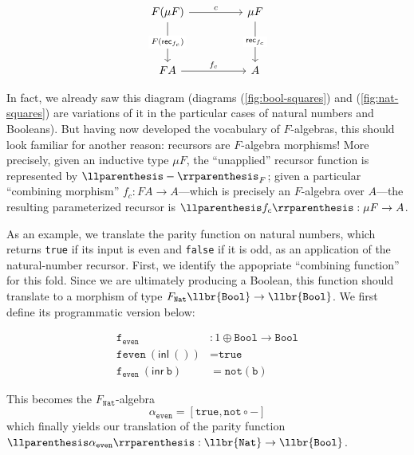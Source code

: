 \[\begin{tikzcd}
	{F(\mu F)} && {\mu F} \\
	\\
	{F A} && A
	\arrow["c", from=1-1, to=1-3]
	\arrow["{F (\mathsf{rec}_{f_c})}"{description}, from=1-1, to=3-1]
	\arrow["{\mathsf{rec}_{f_c}}"{description}, from=1-3, to=3-3]
	\arrow["{f_c}", from=3-1, to=3-3]
\end{tikzcd}\]

In fact, we already saw this diagram (diagrams (\ref{fig:bool-squares}) and (\ref{fig:nat-squares})
are variations of it in the particular cases of natural numbers and Booleans). But having now
developed the vocabulary of $F$-algebras, this should look familiar for another reason: recursors
are $F$-algebra morphisms! More precisely, given an inductive type $\mu F$, the ``unapplied''
recursor function is represented by $\llpr{-}_F$; given a particular ``combining morphism'' $f_c : F
A \to A$---which is precisely an $F$-algebra over $A$---the resulting parameterized recursor is
$\llpr{f_c} : \mu F \to A$.

As an example, we translate the parity function on natural numbers, which returns \texttt{true} if
its input is even and \texttt{false} if it is odd, as an application of the natural-number recursor.
First, we identify the appopriate ``combining function'' for this fold. Since we are ultimately
producing a Boolean, this function should translate to a morphism of type $F_\texttt{Nat}
\llbr{\texttt{Bool}} \to \llbr{\texttt{Bool}}$. We first define its programmatic version below:

\begin{align*}
\texttt{f}_\texttt{even} &: 1 \oplus \texttt{Bool} \to \texttt{Bool}\\
\texttt{f}\texttt{even}~(\mathsf{inl}~()) &= \texttt{true}\\
\texttt{f}_\texttt{even}~(\mathsf{inr}~\texttt{b}) &= \texttt{not}(\texttt{b})
\end{align*}

This becomes the $F_\texttt{Nat}$-algebra
\[ \alpha_\texttt{even} = [\mathtt{true}, \mathtt{not} \circ -] \] which finally
yields our translation of the parity function $\llpr{\alpha_\texttt{even}} : \llbr{\texttt{Nat}} \to
\llbr{\texttt{Bool}}$.

